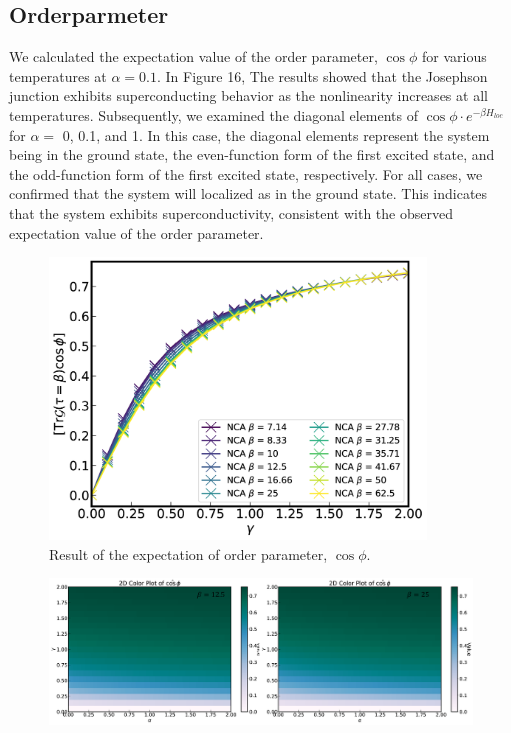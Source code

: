 \documentclass{article}[12pt]
\begin{document}
\begin{spacing}{1.5}
\subsection{Orderparmeter}
We calculated the expectation value of the order parameter, $\cos\phi$ for various temperatures at $\alpha = 0.1$. 
In Figure 16, The results showed that the Josephson junction exhibits superconducting behavior as the nonlinearity increases at all temperatures. 
Subsequently, we examined the diagonal elements of $\cos\phi \cdot e^{−βH_{loc}}$ for $\alpha=$ 0, 0.1, and 1. 
In this case, the diagonal elements represent the system being in the ground state, the even-function form of the first excited state, 
and the odd-function form of the first excited state, respectively. 
For all cases, we confirmed that the system will localized as in the ground state. 
This indicates that the system exhibits superconductivity, consistent with the observed expectation value of the order parameter.\\
\begin{figure}[htbp]
  \centerline{\includegraphics[width=10cm]{TexFigure/Expec_alp_0.1 (1).png}}
  \caption{Result of the expectation of order parameter, $\cos\phi$.}
\end{figure}
\begin{figure}[htbp]
  \centerline{\includegraphics[width=16cm]{TexFigure/Order_color.png}}

\end{figure}
\end{spacing}
\end{document}
